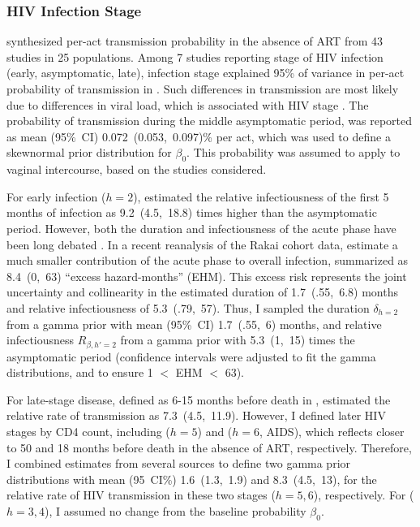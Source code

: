\subsubsection{HIV Infection Stage}\label{model.par.beta.hiv}
\citet{Boily2009} synthesized per-act transmission probability in the absence of ART
from 43 studies in 25 populations.
Among 7 studies reporting stage of HIV infection (early, asymptomatic, late),
infection stage explained 95\% of variance
in per-act probability of transmission in \cite{Boily2009}.
Such differences in transmission are most likely due to differences in viral load,
which is associated with HIV stage \cite{Saag1996,Donnell2010}.
The probability of transmission during the middle asymptomatic period,
was reported as mean (95\%~CI) 0.072~(0.053,~0.097)\% per act,
which was used to define a skewnormal prior distribution for $\beta_0$.
This probability was assumed to apply to vaginal intercourse,
based on the studies considered.
\par
For early infection ($h=2$), \citet{Boily2009} estimated
the relative infectiousness of the first 5 months of infection
as 9.2~(4.5,~18.8) times higher than the asymptomatic period.
However, both the duration and infectiousness of the acute phase
have been long debated \cite{Hollingsworth2008,Cohen2011,Cohen2012}.
In a recent reanalysis of the Rakai cohort data, \citet{Bellan2015} estimate
a much smaller contribution of the acute phase to overall infection,
summarized as 8.4~(0,~63) ``excess hazard-months'' (EHM).
This excess risk represents the joint uncertainty and collinearity in the estimated
duration of 1.7~(.55,~6.8) months and relative infectiousness of 5.3~(.79,~57).
Thus, I sampled the duration $\delta_{h=2}$ from
a gamma prior with mean (95\%~CI) 1.7~(.55,~6) months,
and relative infectiousness $R_{\beta,h'=2}$ from
a gamma prior with 5.3~(1,~15) times the asymptomatic period
(confidence intervals were adjusted to fit the gamma distributions, and to ensure 1 $<$ EHM $<$ 63).
\par
For late-stage disease, defined as 6-15 months before death in \cite{Boily2009},
\citeauthor{Boily2009} estimated the relative rate of transmission as 7.3~(4.5,~11.9).
However, I defined later HIV stages by CD4 count, including
 ($h=5$) and  ($h=6$, AIDS),
which reflects closer to 50 and 18 months before death in the absence of ART, respectively.
Therefore, I combined estimates from several sources
\cite{Wawer2005,Boily2009,Donnell2010} to define two gamma prior distributions
with mean (95~CI\%) 1.6~(1.3,~1.9) and 8.3~(4.5,~13),
for the relative rate of HIV transmission in these two stages ($h=5,6$), respectively.
For  ($h=3,4$), I assumed no change from the baseline probability $\beta_0$.
